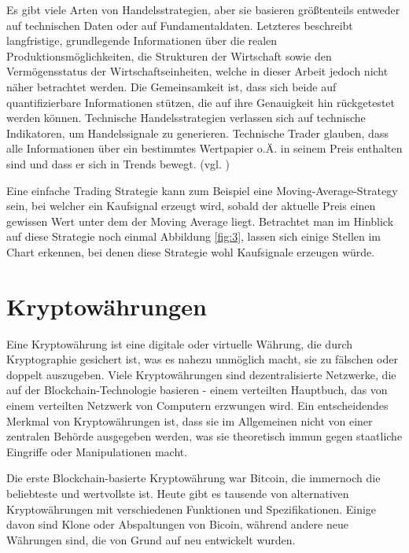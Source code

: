 \documentclass[oneside]{ausarbeitung}
\begin{document}
Es gibt viele Arten von Handelsstrategien, aber sie basieren größtenteils entweder auf technischen Daten oder auf Fundamentaldaten. Letzteres beschreibt langfristige, grundlegende Informationen über die realen Produktionsmöglichkeiten, die Strukturen der Wirtschaft sowie den Vermögensstatus der Wirtschaftseinheiten, welche in dieser Arbeit jedoch nicht näher betrachtet werden\cite{fundamentaldaten}. Die Gemeinsamkeit ist, dass sich beide auf quantifizierbare Informationen stützen, die auf ihre Genauigkeit hin rückgetestet werden können.
Technische Handelsstrategien verlassen sich auf technische Indikatoren, um Handelssignale zu generieren. Technische Trader glauben, dass alle Informationen über ein bestimmtes Wertpapier o.Ä. in seinem Preis enthalten sind und dass er sich in Trends bewegt. (vgl. \cite{trading_strategy}) 

Eine einfache Trading Strategie kann zum Beispiel eine Moving-Average-Strategy sein, bei welcher ein Kaufsignal erzeugt wird, sobald der aktuelle Preis einen gewissen Wert unter dem der Moving Average liegt. Betrachtet man im Hinblick auf diese Strategie noch einmal Abbildung \ref{fig:3}, lassen sich einige Stellen im Chart erkennen, bei denen diese Strategie wohl Kaufsignale erzeugen würde.


\section{Kryptowährungen}
\label{sec:kryptowährungen}

Eine Kryptowährung ist eine digitale oder virtuelle Währung, die durch Kryptographie gesichert ist, was es nahezu unmöglich macht, sie zu fälschen oder doppelt auszugeben. Viele Kryptowährungen sind dezentralisierte Netzwerke, die auf der Blockchain-Technologie basieren - einem verteilten Hauptbuch, das von einem verteilten Netzwerk von Computern erzwungen wird. Ein entscheidendes Merkmal von Kryptowährungen ist, dass sie im Allgemeinen nicht von einer zentralen Behörde ausgegeben werden, was sie theoretisch immun gegen staatliche Eingriffe oder Manipulationen macht.

Die erste Blockchain-basierte Kryptowährung war Bitcoin, die immernoch die beliebteste und wertvollste ist. Heute gibt es tausende von alternativen Kryptowährungen mit verschiedenen Funktionen und Spezifikationen. Einige davon sind Klone oder Abspaltungen von Bicoin, während andere neue Währungen sind, die von Grund auf neu entwickelt wurden.
\end{document}
